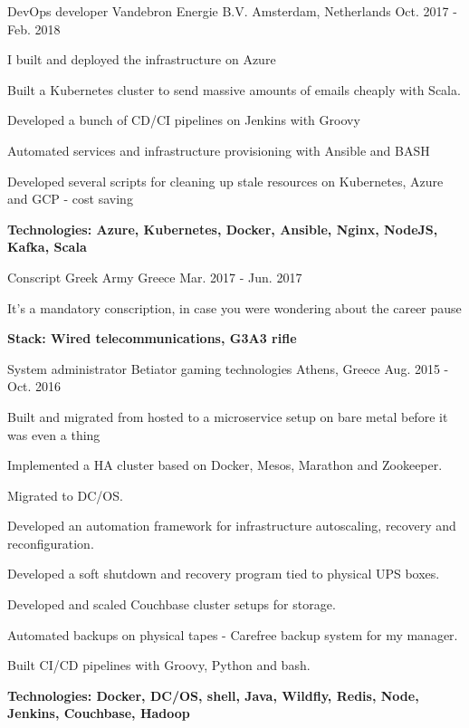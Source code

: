 \begin{cventries}

\cventry
{DevOps developer} %
{Vandebron Energie B.V.} %
{Amsterdam, Netherlands} %
{Oct. 2017 - Feb. 2018} %
{ %
\begin{cvitems}
\item {I built and deployed the infrastructure on Azure}
\item {Built a Kubernetes cluster to send massive amounts of emails cheaply with Scala.}
\item {Developed a bunch of CD/CI pipelines on Jenkins with Groovy}
\item {Automated services and infrastructure provisioning with Ansible and BASH}
\item {Developed several scripts for cleaning up stale resources on Kubernetes, Azure and GCP - cost saving}
\item {\bfseries{Technologies:} Azure, Kubernetes, Docker, Ansible, Nginx, NodeJS, Kafka, Scala }
\end{cvitems}
}


\cventry
{Conscript} %
{Greek Army} %
{Greece} %
{Mar. 2017 - Jun. 2017} %
{ %
\begin{cvitems}
\item {It's a mandatory conscription, in case you were wondering about the career pause}
\item {\bfseries{Stack:} Wired telecommunications, G3A3 rifle}
\end{cvitems}
}


\cventry
{System administrator} %
{Betiator gaming technologies} %
{Athens, Greece} %
{Aug. 2015 - Oct. 2016} %
{ %
\begin{cvitems}
\item {Built and migrated from hosted to a microservice setup on bare metal before it was even a thing}
\item {Implemented a HA cluster based on Docker, Mesos, Marathon and Zookeeper.}
\item {Migrated to DC/OS.}
\item {Developed an automation framework for infrastructure autoscaling, recovery and reconfiguration.}
\item {Developed a soft shutdown and recovery program tied to physical UPS boxes.}
\item {Developed and scaled Couchbase cluster setups for storage.}
\item {Automated backups on physical tapes - Carefree backup system for my manager.}
\item {Built CI/CD pipelines with Groovy, Python and bash.}
\item {\bfseries{Technologies:} Docker, DC/OS, shell, Java, Wildfly, Redis, Node, Jenkins, Couchbase, Hadoop}
\end{cvitems}
}


\end{cventries}
